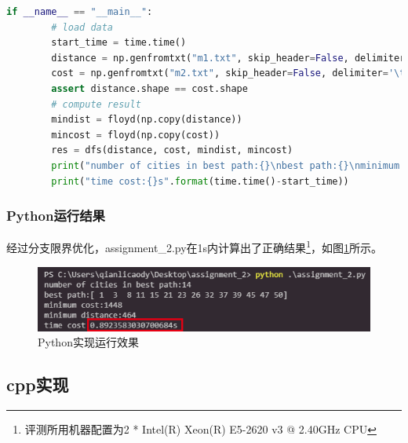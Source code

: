 \documentclass[a4paper,12pt]{article}
\begin{document}
\begin{lstlisting}[language=Python]
    if __name__ == "__main__":
        # load data
        start_time = time.time()
        distance = np.genfromtxt("m1.txt", skip_header=False, delimiter='\t', dtype=np.int32)
        cost = np.genfromtxt("m2.txt", skip_header=False, delimiter='\t', dtype=np.int32)
        assert distance.shape == cost.shape
        # compute result
        mindist = floyd(np.copy(distance))
        mincost = floyd(np.copy(cost))
        res = dfs(distance, cost, mindist, mincost)
        print("number of cities in best path:{}\nbest path:{}\nminimum cost:{}\nminimum distance:{}".format(len(res[0]), np.array(res[0])+1, res[1], res[2]))
        print("time cost:{}s".format(time.time()-start_time))
\end{lstlisting}
\subsubsection{Python运行结果}
经过分支限界优化，assignment\_2.py在1s内计算出了正确结果\footnote{评测所用机器配置为2 * Intel(R) Xeon(R) E5-2620 v3 @ 2.40GHz CPU}，如图\ref{fig-python-result}所示。
\begin{figure}[h]
    \centering
    \includegraphics{./src/python_result.png}
    \caption{Python实现运行效果}
    \label{fig-python-result}
\end{figure}
\subsection{cpp实现}
\end{document}
